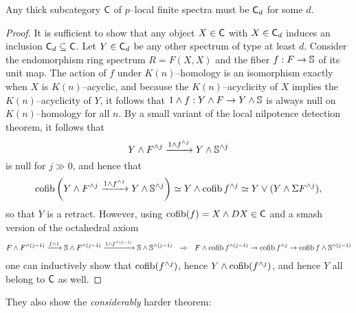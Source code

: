 \begin{theorem}
Any thick subcategory $\CatOf C$ of $p$--local finite spectra must be $\CatOf C_d$ for some $d$.
\end{theorem}
\begin{proof}
It is sufficient to show that any object $X \in \CatOf C$ with $X \in \CatOf C_d$ induces an inclusion $\CatOf C_d \subseteq \CatOf C$.  Let $Y \in \CatOf C_d$ be any other spectrum of type at least $d$.  Consider the endomorphism ring spectrum $R = F(X, X)$ and the fiber $f: F \to \S$ of its unit map.  The action of $f$ under $K(n)$--homology is an isomorphism exactly when $X$ is $K(n)$--acyclic, and because the $K(n)$--acyclicity of $X$ implies the $K(n)$--acyclicity of $Y$, it follows that $1 \sm f: Y \sm F \to Y \sm \S$ is always null on $K(n)$--homology for all $n$.  By a small variant of the local nilpotence detection theorem, it follows that \[Y \sm F^{\sm j} \xrightarrow{1 \sm f^{\sm j}} Y \sm \S^{\sm j}\] is null for $j \gg 0$, and hence that \[\operatorname{cofib}\left( Y \sm F^{\sm j} \xrightarrow{1 \sm f^{\sm j}} Y \sm \S^{\sm j} \right) \simeq Y \sm \operatorname{cofib} f^{\sm j} \simeq Y \vee (Y \sm \Susp F^{\sm j}),\] so that $Y$ is a retract.  However, using $\operatorname{cofib}(f) = X \sm DX \in \CatOf C$ and a smash version of the octahedral axiom
\begin{align*}
F \sm F^{\sm (j-1)} & \xrightarrow{f \sm 1} \S \sm F^{\sm (j-1)} \xrightarrow{1 \sm f^{\sm (j-1)}} \S \sm \S^{\sm (j-1)} & \Rightarrow & &  F \sm \operatorname{cofib} f^{\sm (j-1)} \to \operatorname{cofib} f^{\sm j} \to \operatorname{cofib} f \sm \S^{\sm (j-1)}
\end{align*}
one can inductively show that $\operatorname{cofib}(f^{\sm j})$, hence $Y \sm \operatorname{cofib}(f^{\sm j})$, and hence $Y$ all belong to $\CatOf C$ as well.
\end{proof}

They also show the \emph{considerably} harder theorem:

